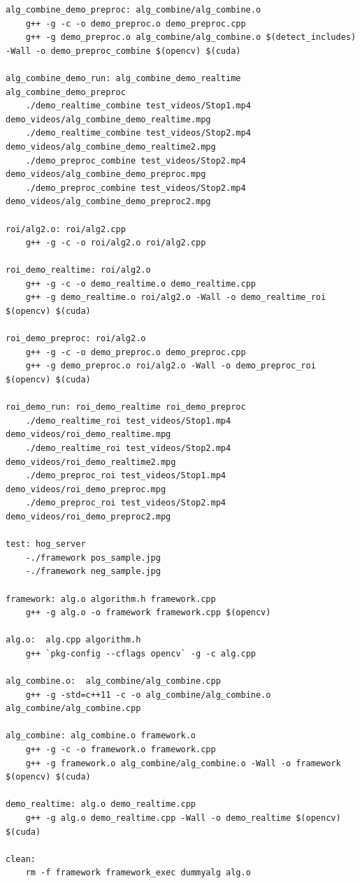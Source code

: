 \documentclass[letterpaper,10pt,titlepage]{article}
\begin{document}
\begin{lstlisting}
alg_combine_demo_preproc: alg_combine/alg_combine.o
	g++ -g -c -o demo_preproc.o demo_preproc.cpp
	g++ -g demo_preproc.o alg_combine/alg_combine.o $(detect_includes) -Wall -o demo_preproc_combine $(opencv) $(cuda)

alg_combine_demo_run: alg_combine_demo_realtime alg_combine_demo_preproc 
	./demo_realtime_combine test_videos/Stop1.mp4 demo_videos/alg_combine_demo_realtime.mpg 
	./demo_realtime_combine test_videos/Stop2.mp4 demo_videos/alg_combine_demo_realtime2.mpg 
	./demo_preproc_combine test_videos/Stop2.mp4 demo_videos/alg_combine_demo_preproc.mpg 
	./demo_preproc_combine test_videos/Stop2.mp4 demo_videos/alg_combine_demo_preproc2.mpg 

roi/alg2.o: roi/alg2.cpp
	g++ -g -c -o roi/alg2.o roi/alg2.cpp

roi_demo_realtime: roi/alg2.o
	g++ -g -c -o demo_realtime.o demo_realtime.cpp
	g++ -g demo_realtime.o roi/alg2.o -Wall -o demo_realtime_roi $(opencv) $(cuda)

roi_demo_preproc: roi/alg2.o
	g++ -g -c -o demo_preproc.o demo_preproc.cpp
	g++ -g demo_preproc.o roi/alg2.o -Wall -o demo_preproc_roi $(opencv) $(cuda)

roi_demo_run: roi_demo_realtime roi_demo_preproc 
	./demo_realtime_roi test_videos/Stop1.mp4 demo_videos/roi_demo_realtime.mpg 
	./demo_realtime_roi test_videos/Stop2.mp4 demo_videos/roi_demo_realtime2.mpg 
	./demo_preproc_roi test_videos/Stop1.mp4 demo_videos/roi_demo_preproc.mpg 
	./demo_preproc_roi test_videos/Stop2.mp4 demo_videos/roi_demo_preproc2.mpg 

test: hog_server
	-./framework pos_sample.jpg 
	-./framework neg_sample.jpg

framework: alg.o algorithm.h framework.cpp 
	g++ -g alg.o -o framework framework.cpp $(opencv)

alg.o:	alg.cpp algorithm.h
	g++ `pkg-config --cflags opencv` -g -c alg.cpp  

alg_combine.o:	alg_combine/alg_combine.cpp 
	g++ -g -std=c++11 -c -o alg_combine/alg_combine.o alg_combine/alg_combine.cpp

alg_combine: alg_combine.o framework.o
	g++ -g -c -o framework.o framework.cpp
	g++ -g framework.o alg_combine/alg_combine.o -Wall -o framework $(opencv) $(cuda)

demo_realtime: alg.o demo_realtime.cpp
	g++ -g alg.o demo_realtime.cpp -Wall -o demo_realtime $(opencv) $(cuda)

clean:
	rm -f framework framework_exec dummyalg alg.o

\end{lstlisting}
\newpage
\end{document}
